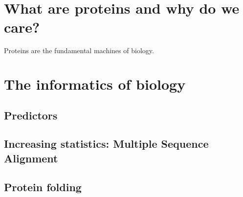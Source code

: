 \chapter{What are proteins and why do we care?}
Proteins are the fundamental machines of biology.


\chapter{The informatics of biology}


\section{Predictors}

\section{Increasing statistics: Multiple Sequence Alignment}

\section{Protein folding}
